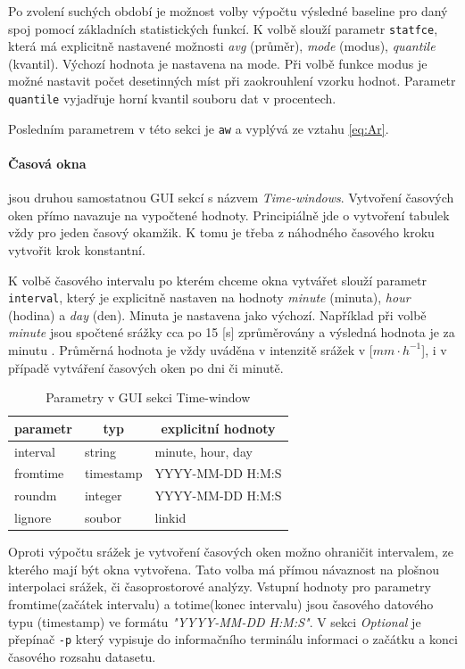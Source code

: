 \documentclass[a4paper,12pt]{report}
\begin{document}
Po zvolení suchých období je možnost volby výpočtu výsledné baseline pro daný spoj pomocí základních statistických funkcí. K volbě slouží parametr \texttt{statfce}, která má explicitně nastavené možnosti \emph{avg} (průměr), \emph{mode} (modus), \emph{quantile} (kvantil). Výchozí hodnota je nastavena na mode. Při volbě funkce modus je možné nastavit počet desetinných míst při zaokrouhlení vzorku hodnot. Parametr \texttt{quantile}  vyjadřuje horní kvantil souboru dat v procentech. 

Posledním parametrem v této sekci je \texttt{aw} a vyplývá ze vztahu \ref{eq:Ar}.


\paragraph*{Časová okna} jsou druhou samostatnou GUI sekcí s názvem \textit{Time-windows}. Vytvoření časových oken přímo navazuje na vypočtené hodnoty. Principiálně jde o vytvoření tabulek vždy pro jeden časový okamžik. K tomu je třeba z náhodného časového kroku vytvořit krok konstantní.

K volbě časového intervalu po kterém chceme okna vytvářet slouží parametr \texttt{interval}, který je explicitně nastaven na hodnoty \emph{minute} (minuta), \emph{hour} (hodina) a \emph{day} (den). Minuta je nastavena jako výchozí.  Například při volbě \emph{minute} jsou spočtené srážky cca po 15 [s] zprůměrovány a výsledná hodnota je za minutu . Průměrná hodnota je vždy uváděna v intenzitě srážek v [$mm \cdot h^{-1}$], i v případě vytváření časových oken po dni či minutě.
\begin{table}[h]
\centering
\begin{tabular}{|lll|}
\hline
\multicolumn{1}{|c}{parametr} & \multicolumn{1}{c}{typ} & \multicolumn{1}{c|}{explicitní hodnoty} \\ \hline\hline
interval                               & string                  & minute, hour, day             \\
fromtime                               & timestamp               & YYYY-MM-DD H:M:S              \\
roundm                                 & integer                 & YYYY-MM-DD H:M:S              \\
lignore                                & soubor                  & linkid                        \\ \hline
\end{tabular}
\caption{Parametry v GUI sekci Time-window}
\label{my-label}
\end{table}
Oproti výpočtu srážek je vytvoření časových oken možno ohraničit intervalem, ze kterého mají být okna vytvořena. Tato volba má přímou návaznost na plošnou interpolaci srážek, či časoprostorové analýzy. Vstupní hodnoty pro parametry fromtime(začátek intervalu) a totime(konec intervalu) jsou časového datového typu (timestamp) ve formátu \emph{"YYYY-MM-DD H:M:S"}. V sekci \textit{Optional} je přepínač \texttt{-p} který vypisuje do informačního terminálu informaci o začátku a konci časového rozsahu datasetu.
\end{document}
